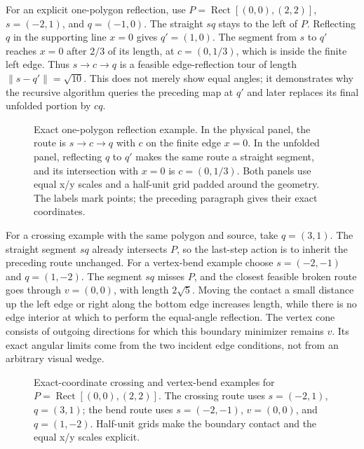 \documentclass[12pt,a4paper]{article}
\newcommand{\norm}[1]{\lVert#1\rVert}
\newcommand{\Rect}[2]{\operatorname{Rect}\!\left[#1,#2\right]}
\begin{document}
For an explicit one-polygon reflection, use \(P=\Rect{(0,0)}{(2,2)}\), \(s=(-2,1)\), and \(q=(-1,0)\). The straight \(sq\) stays to the left of \(P\). Reflecting \(q\) in the supporting line \(x=0\) gives \(q'=(1,0)\). The segment from \(s\) to \(q'\) reaches \(x=0\) after \(2/3\) of its length, at \(c=(0,1/3)\), which is inside the finite left edge. Thus \(s\to c\to q\) is a feasible edge-reflection tour of length \(\norm{s-q'}=\sqrt{10}\). This does not merely show equal angles; it demonstrates why the recursive algorithm queries the preceding map at \(q'\) and later replaces its final unfolded portion by \(cq\).

\begin{figure}[h]\centering\figreflection\caption{Exact one-polygon reflection example. In the physical panel, the route is \(s\to c\to q\) with \(c\) on the finite edge \(x=0\). In the unfolded panel, reflecting \(q\) to \(q'\) makes the same route a straight segment, and its intersection with \(x=0\) is \(c=(0,1/3)\). Both panels use equal x/y scales and a half-unit grid padded around the geometry. The labels mark points; the preceding paragraph gives their exact coordinates.}\label{fig:reflection-example}\end{figure}

For a crossing example with the same polygon and source, take \(q=(3,1)\). The straight segment \(sq\) already intersects \(P\), so the last-step action is to inherit the preceding route unchanged. For a vertex-bend example choose \(s=(-2,-1)\) and \(q=(1,-2)\). The segment \(sq\) misses \(P\), and the closest feasible broken route goes through \(v=(0,0)\), with length \(2\sqrt5\). Moving the contact a small distance up the left edge or right along the bottom edge increases length, while there is no edge interior at which to perform the equal-angle reflection. The vertex cone consists of outgoing directions for which this boundary minimizer remains \(v\). Its exact angular limits come from the two incident edge conditions, not from an arbitrary visual wedge.

\begin{figure}[h]\centering\figcrossbend\caption{Exact-coordinate crossing and vertex-bend examples for \(P=\Rect{(0,0)}{(2,2)}\). The crossing route uses \(s=(-2,1)\), \(q=(3,1)\); the bend route uses \(s=(-2,-1)\), \(v=(0,0)\), and \(q=(1,-2)\). Half-unit grids make the boundary contact and the equal x/y scales explicit.}\label{fig:cross-bend}\end{figure}
\end{document}
